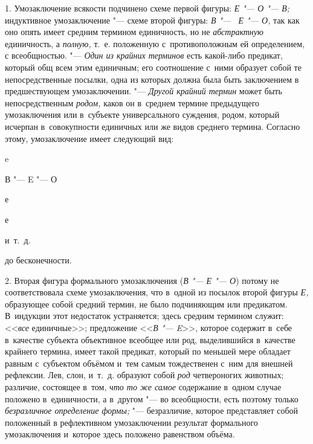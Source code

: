 1. Умозаключение всякости подчинено схеме первой фигуры:
{\em Е "--- О "--- В;} индуктивное умозаключение "--- схеме второй
фигуры: {\em В "--- ~Е "--- О,} так как оно опять имеет средним термином
единичность, но не {\em абстрактную} единичность, а {\em полную,} т.~е.
положенную с~противоположным ей определением,
с всеобщностью. "--- {\em Один из крайних терминов} есть какой-либо предикат,
который общ всем этим единичным; его соотношение с~ними образует собой
те непосредственные посылки, одна из которых должна была быть заключением
в предшествующем умозаключении. "--- {\em Другой крайний термин}
может быть непосредственным {\em родом,} каков он в~среднем термине
предыдущего умозаключения или в~субъекте универсального
суждения, родом, который исчерпан в~совокупности единичных или же видов
среднего термина. Согласно этому, умозаключение имеет следующий вид:

{\centering
e
\par}

{\centering
В "--- E "--- О
\par}

{\centering
е
\par}

{\centering
е
\par}

{\centering
и~т.~д.
\par}

{\centering
до бесконечности.
\par}

2. Вторая фигура формального умозаключения
({\em В "--- Е "--- О}) потому не соответствовала схеме
умозаключения, что в~одной из посылок второй фигуры
{\em Е,} образующее собой
средний термин, не было подчиняющим или предикатом. В~индукции этот
недостаток устраняется; здесь средним термином служит:
<<{\em все} единичные>>;
предложение <<{\em В "--- E}>>,
которое содержит в~себе в~качестве субъекта объективное
всеобщее или род, выделившийся в~качестве крайнего термина, имеет такой
предикат, который по меньшей мере обладает равным с~субъектом объёмом и~тем
самым тождественен с~ним для внешней рефлексии. Лев, слон, и~т.~д. образуют
собой {\em род} четвероногих животных; различие, состоящее в~том,
{\em что то же самое} содержание в~одном случае положено в~единичности,
а в~другом "--- во всеобщности, есть поэтому только
{\em безразличное определение формы;}
"--- безразличие, которое представляет собой положенный в
рефлективном умозаключении результат формального умозаключения и~которое
здесь положено равенством объёма.

